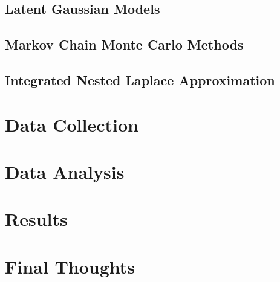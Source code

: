 \documentclass[12pt]{book}
\begin{document}
\section{Latent Gaussian Models}
\section{Markov Chain Monte Carlo Methods}
\section{Integrated Nested Laplace Approximation}
\chapter{Data Collection}
\chapter{Data Analysis}
\chapter{Results}
\chapter{Final Thoughts}
\end{document}
